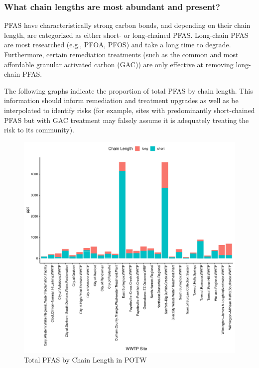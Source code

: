 \documentclass[
  12pt,
]{article}
\begin{document}
\hypertarget{what-chain-lengths-are-most-abundant-and-present}{%
\subsubsection{What chain lengths are most abundant and
present?}\label{what-chain-lengths-are-most-abundant-and-present}}

PFAS have characteristically strong carbon bonds, and depending on their
chain length, are categorized as either short- or long-chained PFAS.
Long-chain PFAS are most researched (e.g., PFOA, PFOS) and take a long
time to degrade. Furthermore, certain remediation treatments (such as
the common and most affordable granular activated carbon (GAC)) are only
effective at removing long-chain PFAS.

The following graphs indicate the proportion of total PFAS by chain
length. This information should inform remediation and treatment
upgrades as well as be interpolated to identify risks (for example,
sites with predominantly short-chained PFAS but with GAC treatment may
falsely assume it is adequately treating the risk to its community).

\begin{figure}

\includegraphics{PFAS_FinalProject_files/figure-latex/unnamed-chunk-20-1} \hfill{}

\caption{Total PFAS by Chain Length in POTW}\label{fig:unnamed-chunk-20}
\end{figure}
\end{document}
